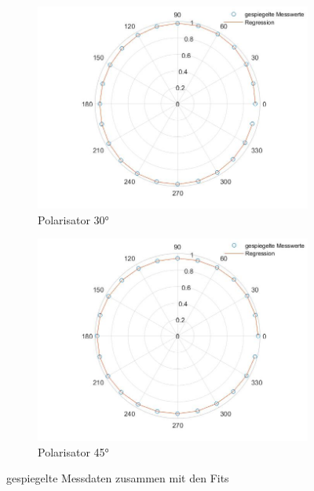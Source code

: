 \documentclass[a4paper, 12pt,]{scrartcl}
\begin{document}
\begin{figure}[H]
\begin{adjustwidth}{-1em}{7em}
  \begin{subfigure}[b]{0.5\textwidth}
    \includegraphics[width=\textwidth]{Fit3}
    \caption{Polarisator 30°}
    \label{fig:}
  \end{subfigure}
  \begin{subfigure}[b]{0.5\textwidth}
    \includegraphics[width=\textwidth]{Fit4}
    \caption{Polarisator 45°}
    \label{fig:}
  \end{subfigure}
\end{adjustwidth}
\caption{gespiegelte Messdaten zusammen mit den Fits}
\end{figure}
\end{document}
